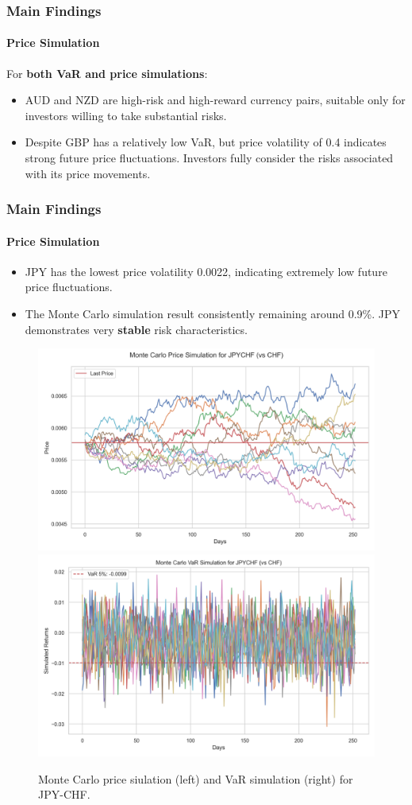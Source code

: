 \documentclass[10pt]{beamer}
\begin{document}
\begin{frame}
\frametitle{Main Findings}
\framesubtitle{Price Simulation}
For \textbf{both VaR and price simulations}:
\begin{itemize}
    \item AUD and NZD are high-risk and high-reward currency pairs, suitable only for investors willing to take substantial risks.
    \item Despite GBP has a relatively low VaR, but price volatility of 0.4 indicates strong future price fluctuations. Investors fully consider the risks associated with its price movements.
\end{itemize}
\end{frame}
\begin{frame}
\frametitle{Main Findings}
\framesubtitle{Price Simulation}
\begin{itemize}
    \item JPY has the lowest price volatility 0.0022, indicating extremely low future price fluctuations. 
    \item The Monte Carlo simulation result consistently remaining around 0.9\%. JPY demonstrates very \textbf{stable} risk characteristics. 
\end{itemize}
\begin{figure}
    \centering  \includegraphics[width=0.48\linewidth]{reports/figures/monte_carlo_price_simulation_JPYCHF_vs_CHF.png}  \label{fig:monte_carlo_price_simulation_JPYCHF_vs_CHF}
    \includegraphics[width=0.48\linewidth]{reports/figures/monte_carlo_var_simulation_JPYCHF_vs_CHF.png}  \label{fig:monte_carlo_var_simulation_JPYCHF_vs_CHF}
    \caption{\footnotesize Monte Carlo price siulation (left) and VaR simulation (right) for JPY-CHF.}
\end{figure}
\end{frame}
\end{document}
